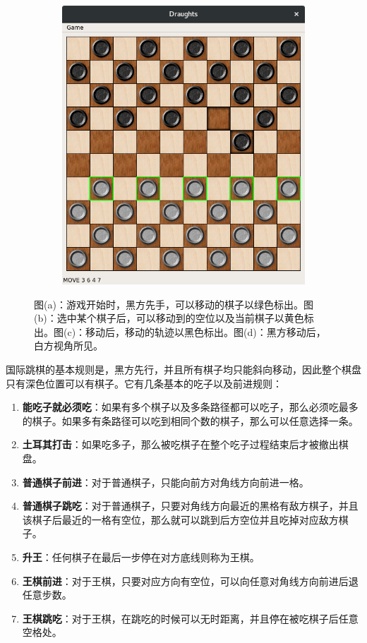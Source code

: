\documentclass[11pt,a4paper]{article}
\begin{document}
\begin{figure}[H]
\begin{subfigure}{.24\textwidth}
		\caption{}
	\end{subfigure}
	\hfill
	\begin{subfigure}{.24\textwidth}
		\centering
		\includegraphics[width=\linewidth]{img4.png}
		\caption{}
	\end{subfigure}
	\caption{图(a)：游戏开始时，黑方先手，可以移动的棋子以绿色标出。图(b)：选中某个棋子后，可以移动到的空位以及当前棋子以黄色标出。图(c)：移动后，移动的轨迹以黑色标出。图(d)：黑方移动后，白方视角所见。}
	\label{fig:1}
\end{figure}

国际跳棋的基本规则是，黑方先行，并且所有棋子均只能斜向移动，因此整个棋盘只有深色位置可以有棋子。它有几条基本的吃子以及前进规则：

\begin{enumerate}
	\item \textbf{能吃子就必须吃}：如果有多个棋子以及多条路径都可以吃子，那么必须吃最多的棋子。如果多有条路径可以吃到相同个数的棋子，那么可以任意选择一条。
	\item \textbf{土耳其打击}：如果吃多子，那么被吃棋子在整个吃子过程结束后才被撤出棋盘。
	\item \textbf{普通棋子前进}：对于普通棋子，只能向前方对角线方向前进一格。
	\item \textbf{普通棋子跳吃}：对于普通棋子，只要对角线方向最近的黑格有敌方棋子，并且该棋子后最近的一格有空位，那么就可以跳到后方空位并且吃掉对应敌方棋子。
	\item \textbf{升王}：任何棋子在最后一步停在对方底线则称为王棋。
	\item \textbf{王棋前进}：对于王棋，只要对应方向有空位，可以向任意对角线方向前进后退任意步数。
	\item \textbf{王棋跳吃}：对于王棋，在跳吃的时候可以无时距离，并且停在被吃棋子后任意空格处。
\end{enumerate}
\end{document}
